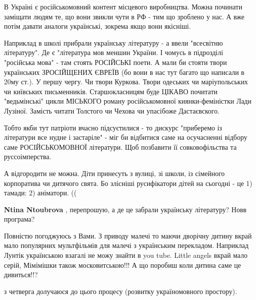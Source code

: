 \begin{itemize}

В Україні є російськомовний контент місцевого виробництва. Можна починати
заміщати людям те, що вони звикли чути в РФ - тим що зроблено у нас. А вже
потім давати аналоги українські, зокрема якщо вони якісніші.

Наприклад в школі прибрали українську літературу - а ввели "всесвітню
літературу". Де є "література мов меншин України. І чомусь в підрозділі
"російська мова" - там стоять РОСІЙСЬКІ поети. А мали би стояти твори
українських ЗРОСІЙЩЕНИХ ЄВРЕЇВ (бо вони в нас тут багато що написали в 20му
ст.). У першу чергу. Чи твори Куркова. Твори одеських чи маріупольських чи
київських письменників. Старшокласницям буде ЦІКАВО почитати "ведьмінські"
цикли МІСЬКОГО роману російськомовної киянки-феміністки Лади Лузіної. Замість
читати Толстого чи Чехова чи упасібоже Дастаєвского.

Тобто якби тут патріоти вчасно підсуєтилися - то дискурс "приберемо із
літератури все нудне і застаріле" - міг би відбитися саме на осучасненні
відбору саме РОСІЙСЬКОМОВНОЇ літератури. Щоб позбавити її совковофільства та
руссоімперства.

А відгородити не можна. Діти принесуть з вулиці, зі школи, із сімейного
корпоратива чи дитячого свята. Бо злісніші русифікатори дітей на сьогодні - це
1) тамади: 2) аніматори. ((

\begin{itemize} %
\textbf{Ntina Ntoubrova} , перепрошую, а де це забрали українську літературу? Новв програма?
\end{itemize} %

Повністю погоджуюсь з Вами.
З приводу малечі то маючи дворічну дитину вкрай мало популярних мультфільмів для малечі з українським перекладом.
Наприклад Лунтік українською взагалі не можу знайти в you tube.
Little angels вкрай мало серій,
Мімімішки також московитською!!!
А що поробиш коли дитина саме це дивиться!!?

з четверга долучаюся до цього процесу (розвитку україномовного простору).

\end{itemize} %
